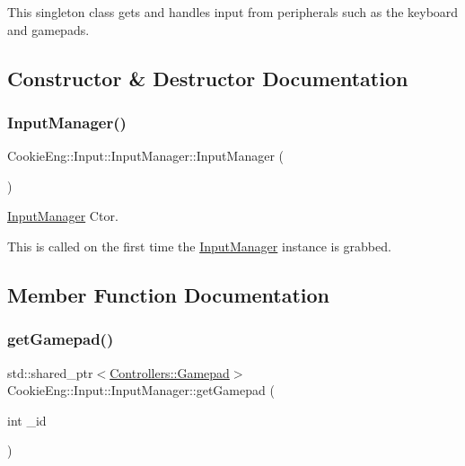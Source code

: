 This singleton class gets and handles input from peripherals such as the keyboard and gamepads. 

\subsection{Constructor \& Destructor Documentation}
\mbox{\label{class_cookie_eng_1_1_input_1_1_input_manager_a6464eabb341068379430b90ec922047a}} 
\subsubsection{\texorpdfstring{Input\+Manager()}{InputManager()}}
{\footnotesize\ttfamily Cookie\+Eng\+::\+Input\+::\+Input\+Manager\+::\+Input\+Manager (\begin{DoxyParamCaption}{ }\end{DoxyParamCaption})\hspace{0.3cm}{\ttfamily [protected]}}



\hyperlink{class_cookie_eng_1_1_input_1_1_input_manager}{Input\+Manager} Ctor. 

This is called on the first time the \hyperlink{class_cookie_eng_1_1_input_1_1_input_manager}{Input\+Manager} instance is grabbed. 

\subsection{Member Function Documentation}
\mbox{\label{class_cookie_eng_1_1_input_1_1_input_manager_a0a5ffdaf3c5293f4c18f3808e46f5369}} 
\subsubsection{\texorpdfstring{get\+Gamepad()}{getGamepad()}}
{\footnotesize\ttfamily std\+::shared\+\_\+ptr$<$\hyperlink{class_cookie_eng_1_1_input_1_1_controllers_1_1_gamepad}{Controllers\+::\+Gamepad}$>$ Cookie\+Eng\+::\+Input\+::\+Input\+Manager\+::get\+Gamepad (\begin{DoxyParamCaption}\item[{int}]{\+\_\+id }\end{DoxyParamCaption})}



